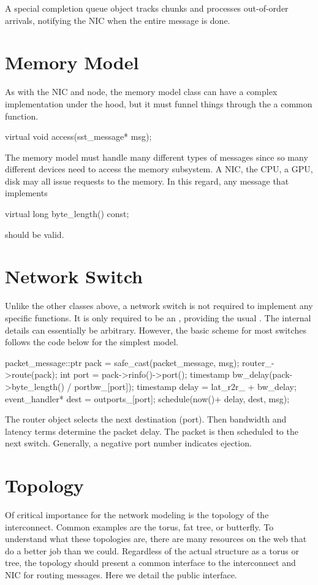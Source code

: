 A special completion queue object tracks chunks and processes out-of-order arrivals,
notifying the NIC when the entire message is done.

\section{Memory Model}
As with the NIC and node, the memory model class can have a complex implementation under the hood,
but it must funnel things through the a common function.

\begin{CppCode}
  virtual void
  access(sst_message* msg);
\end{CppCode}

The memory model must handle many different types of messages since so many different devices need to access the memory subsystem.
A NIC, the CPU, a GPU, disk may all issue requests to the memory.
In this regard, any message that implements

\begin{CppCode}
  virtual long
  byte_length() const;
\end{CppCode}
should be valid.

\section{Network Switch}

Unlike the other classes above, a network switch is not required to implement any specific functions.
It is only required to be an , providing the usual .
The internal details can essentially be arbitrary.
However, the basic scheme for most switches follows the code below for the simplest  model.

\begin{CppCode}
  packet_message::ptr pack = safe_cast(packet_message, msg);
  router_->route(pack);
  int port = pack->rinfo()->port();
  timestamp bw_delay(pack->byte_length() / portbw_[port]);
  timestamp delay = lat_r2r_ + bw_delay;
  event_handler* dest = outports_[port];
  schedule(now()+ delay, dest, msg);
\end{CppCode}
The router object selects the next destination (port).
Then bandwidth and latency terms determine the packet delay.
The packet is then scheduled to the next switch.
Generally, a negative port number indicates ejection.

\section{Topology}
\label{sec:topology}
Of critical importance for the network modeling is the topology of the interconnect.
Common examples are the torus, fat tree, or butterfly.
To understand what these topologies are, there are many resources on the web that do a better job than we could.
Regardless of the actual structure as a torus or tree, the topology should present a common interface to the interconnect and NIC for routing messages.
Here we detail the public interface.
